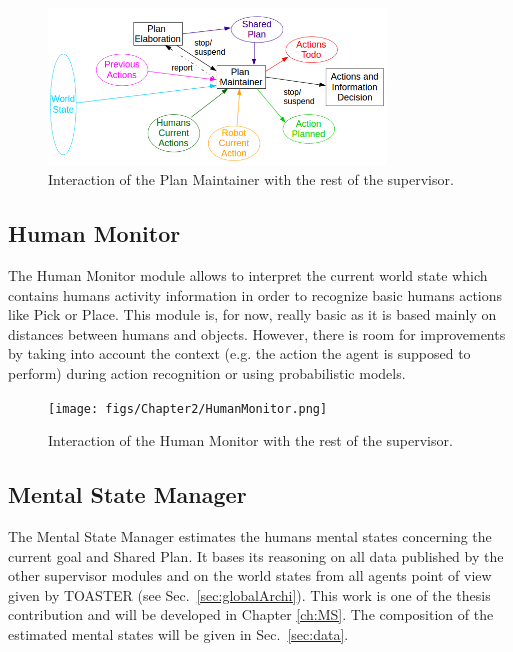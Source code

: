 \documentclass[english,a4paper,11pt,twoside]{StyleThese}
\begin{document}
\begin{figure}[!h]
	\centering
    \includegraphics[width=0.8\textwidth]{figs/Chapter2/PlanMaintainer.png}
    \caption{Interaction of the Plan Maintainer with the rest of the supervisor.}
    \label{fig:planMaintainer}
\end{figure}

\subsection{Human Monitor}

The Human Monitor module allows to interpret the current world state which contains humans activity information in order to recognize basic humans actions like Pick or Place. This module is, for now, really basic as it is based mainly on distances between humans and objects. However, there is room for improvements by taking into account the context (e.g. the action the agent is supposed to perform) during action recognition or using probabilistic models.


\begin{figure}[!h]
	\centering
    \texttt{[image: figs/Chapter2/HumanMonitor.png]}
    \caption{Interaction of the Human Monitor with the rest of the supervisor.}
    \label{fig:humanMonitor}
\end{figure}

\subsection{Mental State Manager}

The Mental State Manager estimates the humans mental states concerning the current goal and Shared Plan. It bases its reasoning on all data published by the other supervisor modules and on the world states from all agents point of view given by TOASTER (see Sec.~\ref{sec:globalArchi}). This work is one of the thesis contribution and will be developed in Chapter \ref{ch:MS}. The composition of the estimated mental states will be given in Sec.~\ref{sec:data}. 
\end{document}
